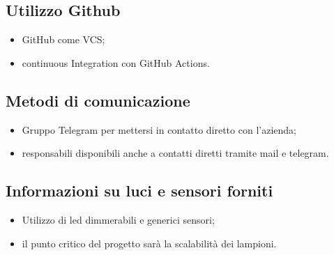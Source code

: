     \subsection{Utilizzo Github}
    \begin{itemize}
        \item GitHub come VCS;
        \item continuous Integration con GitHub Actions.
    \end{itemize}
    \subsection{Metodi di comunicazione}
    \begin{itemize}
        \item Gruppo Telegram per mettersi in contatto diretto con l'azienda;
        \item responsabili disponibili anche a contatti diretti tramite mail e telegram.
    \end{itemize}
    \subsection{Informazioni su luci e sensori forniti}
    \begin{itemize}
        \item Utilizzo di led dimmerabili e generici sensori;
        \item il punto critico del progetto sarà la scalabilità dei lampioni.
    \end{itemize}
